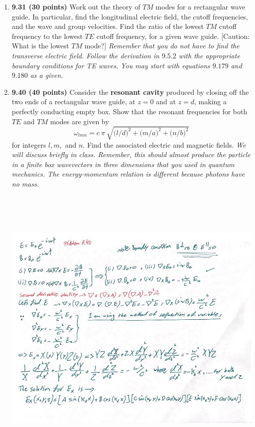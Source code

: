 \documentclass[fleqn]{article}
\begin{document}
\begin{enumerate}
    \item \textbf{9.31 (30 points)} Work out the theory of $TM$ modes for a rectangular wave guide. In particular, find the 
    longitudinal electric field, the cutoff frequencies, and the wave and group velocities. Find the ratio of the lowest 
    $TM$ cutoff frequency to the lowest $TE$ cutoff frequency, for a given wave guide. [Caution: What is the lowest $TM$ mode?]
    \emph{Remember that you do not have to find the transverse electric field.  Follow the derivation in $9.5.2$ with the 
    appropriate boundary conditions for TE waves.  You may start with equations $9.179$ and $9.180$ as a given.}

    \pagebreak

    \item \textbf{9.40 (40 points)} Consider the \textbf{resonant cavity} produced by closing off the two ends of a rectangular 
    wave guide, at $z=0$ and at $z=d$, making a perfectly conducting empty box. Show that the resonant frequencies for 
    both $TE$ and $TM$ modes are given by
    $$
      \omega_{lmn}=c ~ \pi ~ \sqrt{\bigg(l/d \bigg)^2+\bigg(m/a \bigg)^2+\bigg(n/b \bigg)^2} 
    $$
    for integers $l, m,$ and $n$. Find the associated electric and magnetic fields.
    \emph{We will discuss briefly in class.  Remember, this should almost produce the particle in 
    a finite box wavevectors in three dimensions that you used in quantum mechanics. 
    The energy-momentum relation is different because photons have no mass.}

    \begin{center}
      \includegraphics[height=14cm, width=16cm]{1.JPG}
    \end{center}


\end{enumerate}
\end{document}
